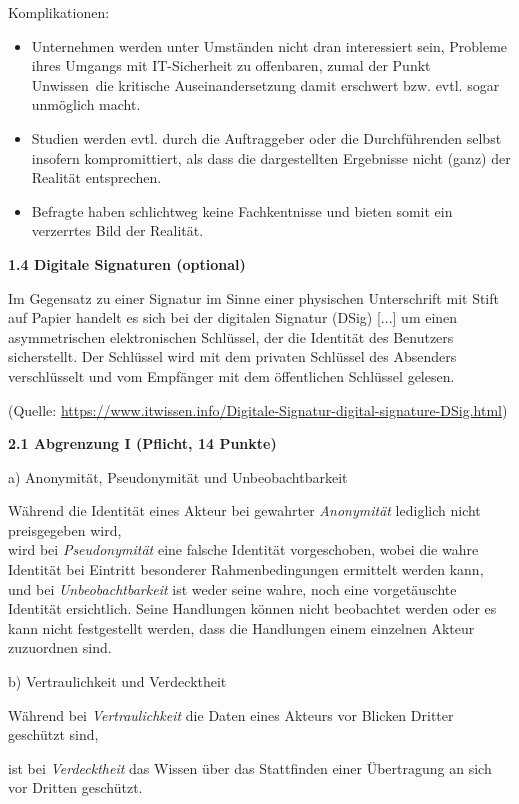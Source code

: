 \documentclass[ngerman]{fbi-aufgabenblatt}
\begin{document}
Komplikationen: 
\begin{itemize}
\item Unternehmen werden unter Umständen nicht dran interessiert sein,
Probleme ihres Umgangs mit IT-Sicherheit zu offenbaren, zumal der Punkt \dq Unwissen\dq \ die kritische Auseinandersetzung damit erschwert bzw. evtl. sogar unmöglich macht.
\item Studien werden evtl. durch die Auftraggeber oder die Durchführenden selbst insofern kompromittiert, als dass die dargestellten Ergebnisse nicht (ganz) der Realität entsprechen.
\item Befragte haben schlichtweg keine Fachkentnisse und bieten somit ein verzerrtes Bild der Realität.
\end{itemize}

\textbf{1.4 Digitale Signaturen (optional)}

Im Gegensatz zu einer Signatur im Sinne einer physischen Unterschrift mit Stift auf Papier handelt es sich
\dq bei der digitalen Signatur (DSig) [...] um einen asymmetrischen elektronischen Schlüssel, 
der die Identität des Benutzers sicherstellt. Der Schlüssel wird mit dem privaten Schlüssel des Absenders verschlüsselt 
und vom Empfänger mit dem öffentlichen Schlüssel gelesen.\dq

(Quelle: \url{https://www.itwissen.info/Digitale-Signatur-digital-signature-DSig.html})


%
%

\textbf{2.1 Abgrenzung I (Pflicht, 14 Punkte)}

a) Anonymität, Pseudonymität und Unbeobachtbarkeit

Während die Identität eines Akteur bei gewahrter \emph{Anonymität} lediglich nicht preisgegeben wird,\\
wird bei \emph{Pseudonymität} eine falsche Identität vorgeschoben, wobei die wahre Identität bei Eintritt besonderer Rahmenbedingungen ermittelt werden kann,\\
und bei \emph{Unbeobachtbarkeit} ist weder seine wahre, noch eine vorgetäuschte Identität ersichtlich. Seine Handlungen können nicht beobachtet werden oder es kann nicht festgestellt werden, dass die Handlungen einem einzelnen Akteur zuzuordnen sind.  

b) Vertraulichkeit und Verdecktheit

Während bei \emph{Vertraulichkeit} die Daten eines Akteurs vor Blicken Dritter geschützt sind,

ist bei \emph{Verdecktheit} das Wissen über das Stattfinden einer Übertragung an sich vor Dritten geschützt.
\end{document}
